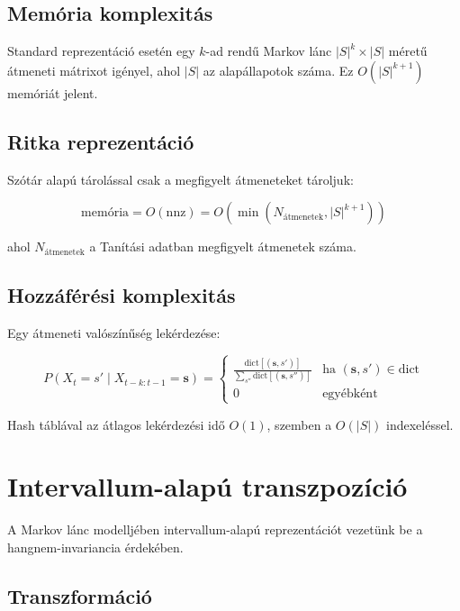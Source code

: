 \subsection{Memória komplexitás}

Standard reprezentáció esetén egy $k$-ad rendű Markov lánc $|S|^k \times |S|$ méretű átmeneti mátrixot igényel, ahol $|S|$ az alapállapotok száma. Ez $O(|S|^{k+1})$ memóriát jelent.

\subsection{Ritka reprezentáció}

Szótár alapú tárolással csak a megfigyelt átmeneteket tároljuk:

\begin{equation}
\text{memória} = O(\text{nnz}) = O(\min(N_{\text{átmenetek}}, |S|^{k+1}))
\end{equation}

ahol $N_{\text{átmenetek}}$ a Tanítási adatban megfigyelt átmenetek száma.

\subsection{Hozzáférési komplexitás}

Egy átmeneti valószínűség lekérdezése:

\begin{equation}
P(X_t = s' \mid X_{t-k:t-1} = \mathbf{s}) = \begin{cases}
\frac{\text{dict}[(\mathbf{s}, s')]}{\sum_{s''} \text{dict}[(\mathbf{s}, s'')]} & \text{ha } (\mathbf{s}, s') \in \text{dict} \\
0 & \text{egyébként}
\end{cases}
\end{equation}

Hash táblával az átlagos lekérdezési idő $O(1)$, szemben a $O(|S|)$ indexeléssel.

\section{Intervallum-alapú transzpozíció}
\label{proof:interval_transposition}

A Markov lánc modelljében intervallum-alapú reprezentációt vezetünk be a hangnem-invariancia érdekében.

\subsection{Transzformáció}

